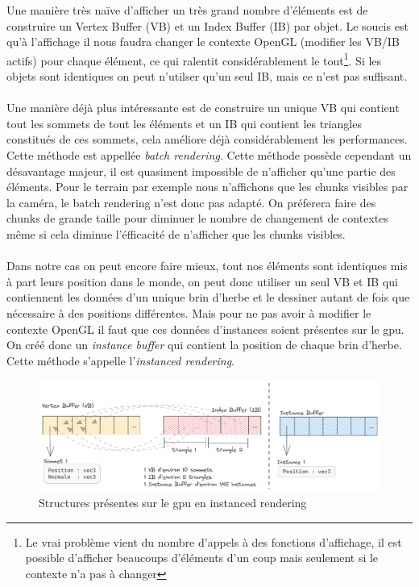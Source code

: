 \documentclass[11pt]{article} %
\begin{document}
Une manière très naïve d'afficher un très grand nombre d'éléments est de construire un Vertex Buffer (VB) et un Index Buffer (IB) par objet. Le soucis est qu'à l'affichage il nous faudra changer le contexte OpenGL (modifier les VB/IB actifs) pour chaque élément, ce qui ralentit considérablement le tout\footnote{Le vrai problème vient du nombre d'appels à des fonctions d'affichage, il est possible d'afficher beaucoups d'éléments d'un coup mais seulement si le contexte n'a pas à changer}.
Si les objets sont identiques on peut n'utilser qu'un seul IB, mais ce n'est pas suffisant.

\paragraph{}
Une manière déjà plus intéressante est de construire un unique VB qui contient tout les sommets de tout les éléments et un IB qui contient les triangles constitués de ces sommets, cela améliore déjà considérablement les performances. Cette méthode est appellée \textit{batch rendering}.
Cette méthode possède cependant un désavantage majeur, il est quasiment impossible de n'afficher qu'une partie des éléments. Pour le terrain par exemple nous n'affichons que les chunks visibles par la caméra, le batch rendering n'est donc pas adapté. On préferera faire des chunks de grande taille pour diminuer le nombre de changement de contextes même si cela diminue l'éfficacité de n'afficher que les chunks visibles.

\paragraph{}
Dans notre cas on peut encore faire mieux, tout nos éléments sont identiques mis à part leurs position dans le monde, on peut donc utiliser un seul VB et IB qui contiennent les données d'un unique brin d'herbe et le dessiner autant de fois que nécessaire à des positions différentes. Mais pour ne pas avoir à modifier le contexte OpenGL il faut que ces données d'instances soient présentes sur le gpu. On créé donc un \textit{instance buffer} qui contient la position de chaque brin d'herbe. Cette méthode s'appelle l'\textit{instanced rendering}.

\begin{figure}[h]
	\centering
	\includegraphics[scale=.4]{grass_vbibib}
	\caption{Structures présentes sur le gpu en instanced rendering}
	\label{fig:grass_vbibib}
\end{figure}
\end{document}
